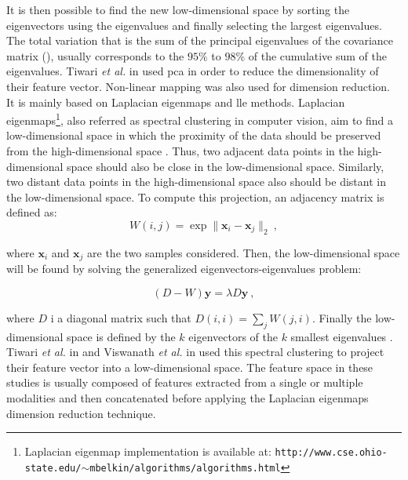 It is then possible to find the new low-dimensional space by sorting the eigenvectors using the eigenvalues and finally selecting the largest eigenvalues.
The total variation that is the sum of the principal eigenvalues of the covariance matrix (\cite{Fodor2002}), usually corresponds to the $95\%$ to $98\%$ of the cumulative sum of the eigenvalues.
Tiwari \textit{et al.} in \cite{Tiwari2008,Tiwari2009,Tiwari2012} used \ac{pca} in order to reduce the dimensionality of their feature vector.
Non-linear mapping was also used for dimension reduction.
It is mainly based on Laplacian eigenmaps and \acf{lle} methods.
Laplacian eigenmaps\footnote{Laplacian eigenmap implementation is available at: \texttt{http://www.cse.ohio-state.edu/\allowbreak $\sim$mbelkin/algorithms/algorithms.html}}, also referred as spectral clustering in computer vision, aim to find a low-dimensional space in which the proximity of the data should be preserved from the high-dimensional space \cite{Shi2000,Belkin2001}.
Thus, two adjacent data points in the high-dimensional space should also be close in the low-dimensional space.
Similarly, two distant data points in the high-dimensional space also should be distant in the low-dimensional space.
To compute this projection, an adjacency matrix is defined as:
\begin{equation}
	W(i,j) = \exp \| \mathbf{x}_i - \mathbf{x}_j \|_2 \ ,
	\label{eq:gew}
\end{equation}

\noindent where $\mathbf{x}_i$ and $\mathbf{x}_j$ are the two samples considered.
Then, the low-dimensional space will be found by solving the generalized eigenvectors-eigenvalues problem:

\begin{equation}
	(D-W)\mathbf{y} = \lambda D \mathbf{y} \ ,
	\label{eq:geeig}
\end{equation}

\noindent where $D$ i a diagonal matrix such that $D(i,i) = \sum_j W(j,i)$.
Finally the low-dimensional space is defined by the $k$ eigenvectors of the $k$ smallest eigenvalues \cite{Belkin2001}.
Tiwari \textit{et al.} in \cite{Tiwari2007,Tiwari2009,Tiwari2009a} and Viswanath \textit{et al.} in \cite{Viswanath2008} used this spectral clustering to project their feature vector into a low-dimensional space.
The feature space in these studies is usually composed of features extracted from a single or multiple modalities and then concatenated before applying the Laplacian eigenmaps dimension reduction technique.

